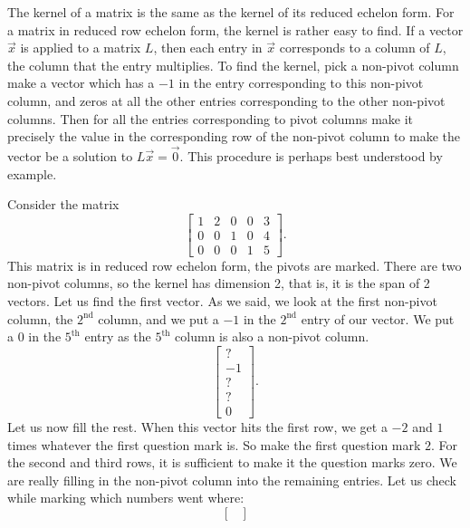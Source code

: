 The kernel of a matrix is the same as the kernel of its reduced echelon
form.  For a matrix in reduced row echelon form, the kernel is rather easy to
find.  If a vector $\vec{x}$ is applied to a matrix $L$, then each entry in
$\vec{x}$ corresponds to a column of $L$, the column that the entry
multiplies.
To find the kernel,
pick a 
non-pivot column make a vector which has a $-1$ in the entry
corresponding to this non-pivot column, and zeros at all the other entries
corresponding to the other non-pivot columns.
Then for all the entries
corresponding to pivot columns make it precisely the value in the
corresponding row of the non-pivot column to make the vector be a
solution to $L \vec{x} = \vec{0}$.
This procedure is perhaps best understood by example.

\begin{example}
Consider the matrix
\begin{equation*}
\begin{bmatrix}
\boxed{1} & 2 & 0 & 0 & 3 \\
0 & 0 & \boxed{1} & 0 & 4 \\
0 & 0 & 0 & \boxed{1} & 5
\end{bmatrix} .
\end{equation*}
This matrix is in reduced row echelon form, the pivots are marked.
There are two non-pivot columns, so the kernel has dimension 2, that
is, it is the span of 2 vectors.  Let us find the first vector.
As we said, we look at the first non-pivot column, the $2^{\text{nd}}$ column, 
and we put a $-1$ in the
$2^{\text{nd}}$ entry of our vector.  We put a $0$ in the $5^{\text{th}}$
entry as the $5^{\text{th}}$ column is also a non-pivot column.
\begin{equation*}
\begin{bmatrix}
? \\ -1 \\ ? \\ ? \\ 0
\end{bmatrix} .
\end{equation*}
Let us now fill the rest.  When this vector hits the first row, we get a
$-2$ and $1$ times whatever the first question mark is.  So make the first
question mark $2$.  For the second and third rows, it is sufficient to make
it the question marks zero.  We are really filling in the non-pivot column
into the remaining entries. Let us check while marking which numbers went
where:
\begin{equation*}
\begin{bmatrix}

\end{bmatrix}
\end{equation*}
\end{example}
